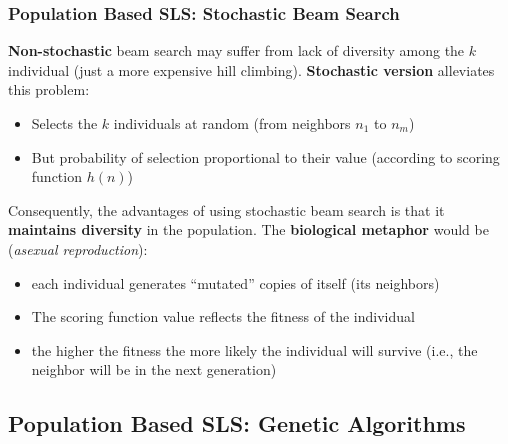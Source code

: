 \documentclass{article}
\def\blu#1{{\color{blu}#1}}
\begin{document}
\subsubsection*{Population Based SLS: Stochastic Beam Search}
\textbf{Non-stochastic} beam search may suffer from lack of diversity among the $ k $ individual (just a more expensive hill climbing). \textbf{Stochastic version} alleviates this problem:
\begin{itemize}[label=$\rightarrow$]
	\item Selects the $ k $ individuals at random (from neighbors $ n_1 $ to $ n_m $)
	\item But probability of selection proportional to their value (according to scoring function $ h(n) $)
\end{itemize}
Consequently, the advantages of using stochastic beam search is that it \textbf{maintains diversity} in the population. The \textbf{biological metaphor} would be (\textit{asexual reproduction}):
\begin{itemize}
	\item each individual generates “\blu{mutated}” copies of itself (its neighbors)
	\item The \blu{scoring function value} reflects \blu{the fitness} of the individual
	\item the higher the fitness the more likely the individual will survive (i.e., the neighbor will be in the next generation)
\end{itemize}

\subsection*{Population Based SLS: Genetic Algorithms}
\end{document}
